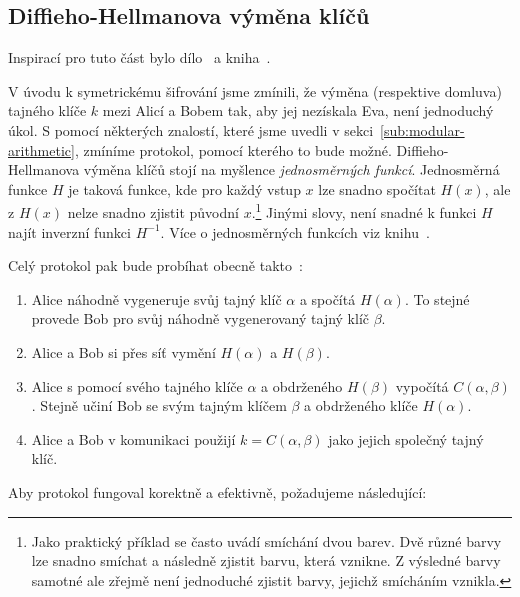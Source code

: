 \documentclass[
  program=infoi,
  biblatex=false,
  figures=true,
  glossaries,
  tables=false,
  sourcecodes=true,
  index
]{kidiplom}
\begin{document}
\subsection{Diffieho-Hellmanova výměna klíčů}\label{sub:diffie-hellman}

    Inspirací pro tuto část bylo dílo~\cite{graduate-course} a kniha~\cite{rsa-and-public}.

    V úvodu k symetrickému šifrování jsme zmínili, že výměna (respektive domluva)
    tajného klíče $k$ mezi Alicí a Bobem tak, aby jej nezískala Eva, není jednoduchý úkol.
    S pomocí některých znalostí, které jsme uvedli v sekci~\ref{sub:modular-arithmetic}, zmíníme protokol, pomocí kterého
    to bude možné.
    Diffieho-Hellmanova výměna klíčů stojí na myšlence \emph{jednosměrných funkcí}.
    Jednosměrná funkce $H$ je taková funkce, kde pro každý vstup $x$ lze
    snadno spočítat $H(x)$, ale z $H(x)$ nelze snadno zjistit původní $x$.\footnote{Jako praktický příklad se často uvádí smíchání dvou barev.
    Dvě různé barvy lze snadno smíchat a následně zjistit barvu, která vznikne.
    Z výsledné barvy samotné ale zřejmě není jednoduché zjistit barvy, jejichž smícháním vznikla.}
    Jinými slovy, není snadné k funkci $H$ najít inverzní funkci $H^{-1}$.
    Více o jednosměrných funkcích viz knihu~\cite{foundations-cryptography}.
    
    \noindent
    Celý protokol pak bude probíhat obecně takto~\cite{graduate-course}:
    
    \begin{enumerate}
        \item
            Alice náhodně vygeneruje svůj tajný klíč $\alpha$ a spočítá $H(\alpha)$.
            To stejné provede Bob pro svůj náhodně vygenerovaný tajný klíč $\beta$.
        \item
            Alice a Bob si přes síť vymění $H(\alpha)$ a $H(\beta)$.
        \item
            Alice s pomocí svého tajného klíče $\alpha$ a obdrženého $H(\beta)$ vypočítá $C(\alpha,\beta)$.
            Stejně učiní Bob se svým tajným klíčem $\beta$ a obdrženého klíče $H(\alpha)$.
        \item
            Alice a Bob v komunikaci použijí $k = C(\alpha,\beta)$ jako jejich společný tajný klíč.
    \end{enumerate}

    \noindent
    Aby protokol fungoval korektně a efektivně, požadujeme následující:
\end{document}

